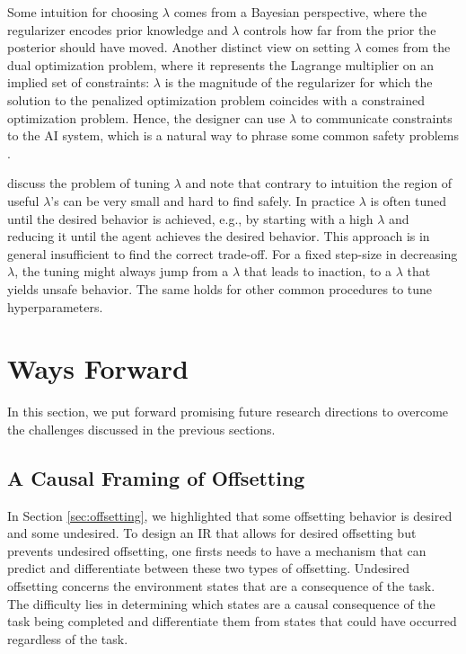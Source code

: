 \documentclass[letterpaper]{article} %
\begin{document}
Some intuition for choosing $\lambda$ comes from a Bayesian perspective, where the regularizer encodes prior knowledge and $\lambda$ controls how far from the prior the posterior should have moved. Another distinct view on setting $\lambda$ comes from the dual optimization problem, where it represents the Lagrange multiplier on an implied set of constraints: $\lambda$ is the magnitude of the regularizer for which the solution to the penalized optimization problem coincides with a constrained optimization problem. Hence, the designer can use $\lambda$ to communicate constraints to the AI system, which is a natural way to phrase some common safety problems \citep{ray2019benchmarking}.

\citet{armstrong2017low} discuss the problem of tuning $\lambda$ and note that contrary to intuition the region of useful $\lambda$'s can be very small and hard to find safely.
In practice $\lambda$ is often tuned until the desired behavior is achieved, e.g., by starting with a high $\lambda$ and reducing it until the agent achieves the desired behavior. This approach is in general insufficient to find the correct trade-off. For a fixed step-size in decreasing $\lambda$, the tuning might always jump from a $\lambda$ that leads to inaction, to a $\lambda$ that yields unsafe behavior. The same holds for other common procedures to tune hyperparameters.

\section{Ways Forward}
\label{sec:alternatives}
In this section, we put forward promising future research directions to overcome the challenges discussed in the previous sections.

\subsection{A Causal Framing of Offsetting} \label{sec:causal_offsetting}
In Section \ref{sec:offsetting}, we highlighted that some offsetting behavior is desired and some undesired. To design an IR that allows for desired offsetting but prevents undesired offsetting, one firsts needs to have a mechanism that can predict and differentiate between these two types of offsetting. Undesired offsetting concerns the environment states that are a consequence of the task. The difficulty lies in determining which states are a causal consequence of the task being completed and differentiate them from states that could have occurred regardless of the task.
\end{document}
